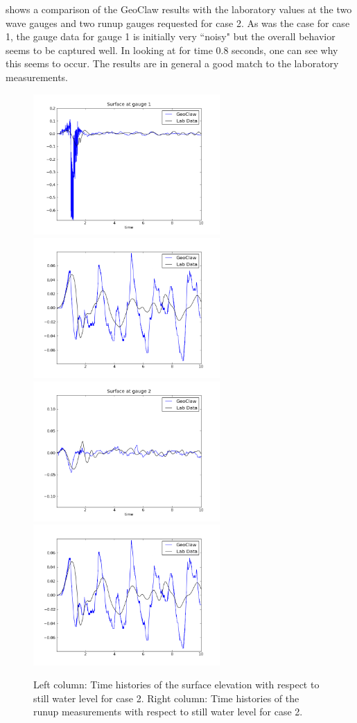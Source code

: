  shows a comparison of the GeoClaw results with the
laboratory values at the two wave gauges and two runup gauges requested
for case 2.  As was the case for case 1, the gauge data for gauge 1 is initially
very ``noisy" but the overall behavior seems to be captured well.  In looking at
 for time 0.8 seconds, one can see why this seems to 
occur.  The results are in general a good match to the laboratory
measurements.

\begin{figure}[ht]
\hfil\includegraphics[width=2.8in]{bp12/case2wavegauge1.png}\hfil
\hfil\includegraphics[width=2.8in]{bp12/case2runupgauge2.png}\hfil
\vskip 5pt
\hfil\includegraphics[width=2.8in]{bp12/case2wavegauge2.png}\hfil
\hfil\includegraphics[width=2.8in]{bp12/case2runupgauge2.png}\hfil
\caption{\label{fig:bp8gauges2}
Left column: Time histories of the surface elevation with respect to still
water level for case 2.
Right column: Time histories of the runup measurements with respect
to still water level for case 2.
  }
\end{figure}


